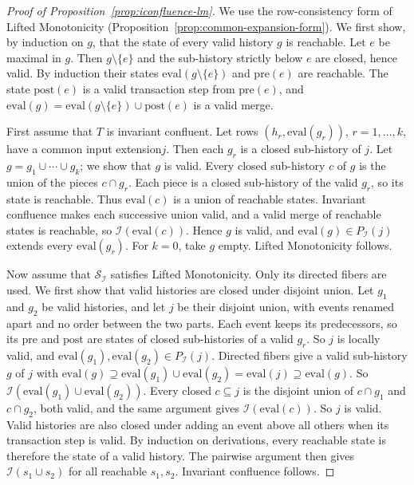 \documentclass[sigconf]{cidr-2027}
\theoremstyle{remark}
\newcommand{\indesc}{input extension\xspace} %
\newcommand{\outrel}{extends\xspace}          %
\newcommand{\Spec}{\mathcal{S}}
\begin{document}
\begin{proof}[Proof of Proposition~\ref{prop:iconfluence-lm}]
We use the row-consistency form of Lifted Monotonicity
(Proposition~\ref{prop:common-expansion-form}). We first show, by induction
on $g$, that the state of every valid history $g$ is reachable. Let $e$ be
maximal in $g$. Then $g\setminus\{e\}$ and the sub-history strictly below $e$
are closed, hence valid. By induction their states
$\mathrm{eval}(g\setminus\{e\})$ and $\mathrm{pre}(e)$ are reachable. The
state $\mathrm{post}(e)$ is a valid transaction step from $\mathrm{pre}(e)$,
and $\mathrm{eval}(g)=\mathrm{eval}(g\setminus\{e\})\cup\mathrm{post}(e)$ is a
valid merge.

First assume that $T$ is invariant confluent. Let rows
$(h_r,\mathrm{eval}(g_r))$, $r=1,\ldots,k$, have a common \indesc $j$. Then each $g_r$ is a closed sub-history of $j$. Let
$g=g_1\cup\cdots\cup g_k$; we show that $g$ is valid. Every closed
sub-history $c$ of $g$ is the union of the pieces $c\cap g_r$. Each piece is
a closed sub-history of the valid $g_r$, so its state is reachable. Thus
$\mathrm{eval}(c)$ is a union of reachable states. Invariant confluence makes each successive union valid, and a valid merge of
reachable states is reachable, so $\mathcal I(\mathrm{eval}(c))$. Hence $g$
is valid, and $\mathrm{eval}(g)\in P_{\mathcal I}(j)$ \outrel every
$\mathrm{eval}(g_r)$. For $k=0$, take $g$ empty. \textcolor{reviewed}{Lifted Monotonicity
follows.}

Now assume that $\Spec_{\mathcal I}$ satisfies Lifted Monotonicity. Only its
directed fibers are used. We first show that valid histories are closed under
disjoint union. Let $g_1$ and $g_2$ be valid histories, and let $j$ be their
disjoint union, with events renamed apart and no order between the two
parts. Each event keeps its
predecessors, so its $\mathrm{pre}$ and $\mathrm{post}$ are states of closed
sub-histories of a valid $g_r$. So $j$ is locally valid, and
$\mathrm{eval}(g_1),\mathrm{eval}(g_2)\in P_{\mathcal I}(j)$. Directed
fibers give a valid sub-history $g$ of $j$ with
$\mathrm{eval}(g)\supseteq\mathrm{eval}(g_1)\cup\mathrm{eval}(g_2)=\mathrm{eval}(j)\supseteq\mathrm{eval}(g)$. So $\mathcal I(\mathrm{eval}(g_1)\cup\mathrm{eval}(g_2))$. Every closed
$c\subseteq j$ is the disjoint union of $c\cap g_1$ and $c\cap g_2$, both
valid, and the same argument gives $\mathcal I(\mathrm{eval}(c))$. So $j$ is
valid. Valid histories are also closed under adding an event above all
others when its transaction step is valid. By induction on derivations, every
reachable state is therefore the state of a valid history. The pairwise
argument then gives $\mathcal I(s_1\cup s_2)$ for all reachable $s_1,s_2$. Invariant confluence follows.
\end{proof}
\end{document}
